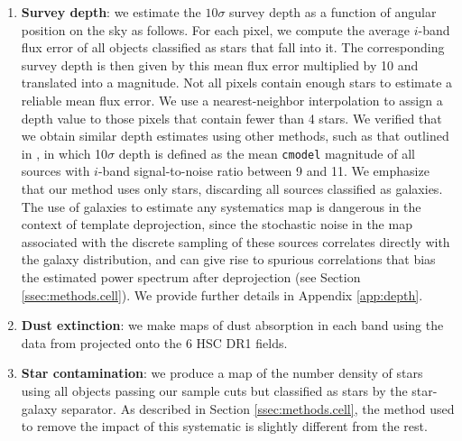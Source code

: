 \documentclass[a4paper,11pt]{article}
\begin{document}
    \begin{enumerate}
      \item {\bf Survey depth}: we estimate the $10\sigma$ survey depth as a function of angular position on the sky as follows. For each pixel, we compute the average $i$-band flux error of all objects classified as stars that fall into it. The corresponding survey depth is then given by this mean flux error multiplied by 10 and translated into a magnitude. Not all pixels contain enough stars to estimate a reliable mean flux error. We use a nearest-neighbor interpolation to assign a depth value to those pixels that contain fewer than 4 stars. We verified that we obtain similar depth estimates using other methods, such as that outlined in \cite{2018PASJ...70S..25M}, in which 10$\sigma$ depth is defined as the mean {\tt cmodel} magnitude of all sources with $i$-band signal-to-noise ratio between 9 and 11. We emphasize that our method uses only stars, discarding all sources classified as galaxies. The use of galaxies to estimate any systematics map is dangerous in the context of template deprojection, since the stochastic noise in the map associated with the discrete sampling of these sources correlates directly with the galaxy distribution, and can give rise to spurious correlations that bias the estimated power spectrum after deprojection (see Section \ref{ssec:methods.cell}). We provide further details in Appendix \ref{app:depth}.
      \item {\bf Dust extinction}: we make maps of dust absorption in each band using the data from \cite{1998ApJ...500..525S} projected onto the 6 HSC DR1 fields.
      \item {\bf Star contamination}: we produce a map of the number density of stars using all objects passing our sample cuts but classified as stars by the star-galaxy separator. As described in Section \ref{ssec:methods.cell}, the method used to remove the impact of this systematic is slightly different from the rest.

\end{enumerate}
\end{document}
